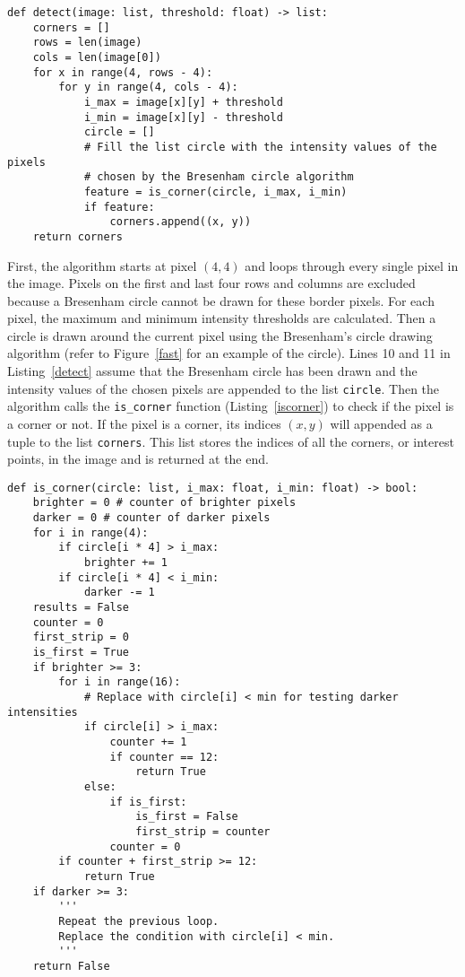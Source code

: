 \vspace{-.2 in}
\begin{singlespace}
\begin{lstlisting}[mathescape, caption= Find corners in image, label=detect]
def detect(image: list, threshold: float) -> list:
    corners = []
    rows = len(image)
    cols = len(image[0])
    for x in range(4, rows - 4):
        for y in range(4, cols - 4):
            i_max = image[x][y] + threshold
            i_min = image[x][y] - threshold
            circle = []
            # Fill the list circle with the intensity values of the pixels
            # chosen by the Bresenham circle algorithm
            feature = is_corner(circle, i_max, i_min)
            if feature:
                corners.append((x, y))
    return corners
\end{lstlisting}
\end{singlespace}

First, the algorithm starts at pixel $(4,4)$ and loops through every single pixel in the image. Pixels on the first and last four rows and columns are excluded because a Bresenham circle cannot be drawn for these border pixels. For each pixel, the maximum and minimum intensity thresholds are calculated. Then a circle is drawn around the current pixel using the Bresenham's circle drawing algorithm (refer to Figure~\ref{fast} for an example of the circle). Lines 10 and 11 in Listing~\ref{detect} assume that the Bresenham circle has been drawn and the intensity values of the chosen pixels are appended to the list \texttt{circle}. Then the algorithm calls the \texttt{is\_corner} function (Listing~\ref{iscorner}) to check if the pixel is a corner or not. If the pixel is a corner,  its indices $(x, y)$ will appended as a tuple to the list \texttt{corners}. This list stores the indices of all the corners, or interest points, in the image and is returned at the end.
\newpage

\vspace{-.2 in}
\begin{singlespace}
\begin{lstlisting}[mathescape, caption= Check for corner at pixel with given Bresenham circle, label=iscorner]
def is_corner(circle: list, i_max: float, i_min: float) -> bool:
    brighter = 0 # counter of brighter pixels
    darker = 0 # counter of darker pixels
    for i in range(4):
        if circle[i * 4] > i_max:
            brighter += 1
        if circle[i * 4] < i_min:
            darker -= 1
    results = False
    counter = 0
    first_strip = 0
    is_first = True
    if brighter >= 3:
        for i in range(16):    
            # Replace with circle[i] < min for testing darker intensities
            if circle[i] > i_max: 
                counter += 1
                if counter == 12:
                    return True
            else:
                if is_first:
                    is_first = False
                    first_strip = counter
                counter = 0
        if counter + first_strip >= 12:
            return True
    if darker >= 3:
        '''
        Repeat the previous loop. 
        Replace the condition with circle[i] < min.
        '''
    return False
\end{lstlisting}
\end{singlespace}

